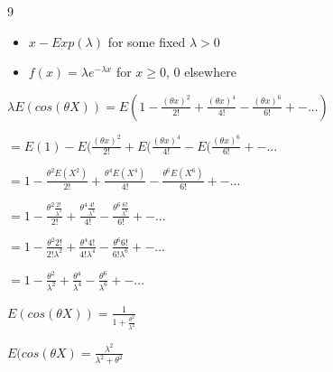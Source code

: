 \documentclass[12 pt]{article}
\begin{document}
    \begin{exercise}{9}
    \hfill
    
    \begin{itemize}
        \item $x - Exp(\lambda)$ for some fixed $\lambda > 0$
        \item $f(x) = \lambda e^{-\lambda x}$ for $x \geq 0$, 0 elsewhere
    \end{itemize}

    $\lambda E(cos(\theta X)) = E(1 - \frac{(\theta x)^2}{2!} + \frac{(\theta x)^4}{4!} - \frac{(\theta x)^6}{6!} +-...)$

    $= E(1) - E(\frac{(\theta x)^2}{2!} + E(\frac{(\theta x)^4}{4!} - E(\frac{(\theta x)^6}{6!} +-...$

    $= 1 - \frac{{\theta}^2 E(X^2)}{2!} + \frac{{\theta}^4 E(X^4)}{4!} - \frac{{\theta}^6 E(X^6)}{6!} +-...$

    $= 1 - \frac{{\theta}^2 \frac{2!}{{\lambda}^2}}{2!} + \frac{{\theta}^4 \frac{4!}{{\lambda}^4}}{4!} - \frac{{\theta}^6 \frac{6!}{{\lambda}^6}}{6!} +-...$

    $= 1 - \frac{{\theta}^2 2!}{2! {\lambda}^2} + \frac{{\theta}^4 4!}{4! {\lambda}^4} - \frac{{\theta}^6 6!}{6! {\lambda}^6} +-...$

    $= 1 - \frac{{\theta}^2}{{\lambda}^2} + \frac{{\theta}^4}{{\lambda}^4} - \frac{{\theta}^6}{{\lambda}^6} +-...$

    $E(cos(\theta X)) = \frac{1}{1 + \frac{{\theta}^2}{{\lambda}^2}}$

    $E(cos(\theta X) = \frac{{\lambda}^2}{{\lambda}^2 + {\theta}^2}$

    \hfill
    \end{exercise}
\end{document}
